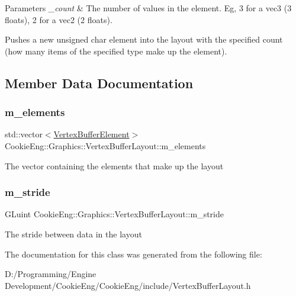 \begin{DoxyParams}{Parameters}
{\em \+\_\+count} & The number of values in the element. Eg, 3 for a vec3 (3 floats), 2 for a vec2 (2 floats).\\
\hline
\end{DoxyParams}
Pushes a new unsigned char element into the layout with the specified count (how many items of the specified type make up the element). 

\subsection{Member Data Documentation}
\mbox{\label{class_cookie_eng_1_1_graphics_1_1_vertex_buffer_layout_a7986bf1ce59d1ffa1dc31613014aa2e7}} 
\subsubsection{\texorpdfstring{m\+\_\+elements}{m\_elements}}
{\footnotesize\ttfamily std\+::vector$<$\hyperlink{struct_cookie_eng_1_1_graphics_1_1_vertex_buffer_element}{Vertex\+Buffer\+Element}$>$ Cookie\+Eng\+::\+Graphics\+::\+Vertex\+Buffer\+Layout\+::m\+\_\+elements\hspace{0.3cm}{\ttfamily [protected]}}

The vector containing the elements that make up the layout \mbox{\label{class_cookie_eng_1_1_graphics_1_1_vertex_buffer_layout_a972f0e9224f28b13be7d959449423308}} 
\subsubsection{\texorpdfstring{m\+\_\+stride}{m\_stride}}
{\footnotesize\ttfamily G\+Luint Cookie\+Eng\+::\+Graphics\+::\+Vertex\+Buffer\+Layout\+::m\+\_\+stride\hspace{0.3cm}{\ttfamily [protected]}}

The stride between data in the layout 

The documentation for this class was generated from the following file\+:\begin{DoxyCompactItemize}
\item 
D\+:/\+Programming/\+Engine Development/\+Cookie\+Eng/\+Cookie\+Eng/include/Vertex\+Buffer\+Layout.\+h\end{DoxyCompactItemize}
